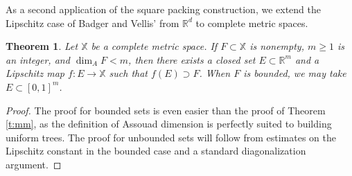 \documentclass[12pt]{amsart}
\newtheorem{theorem}{Theorem}[section]
\theoremstyle{definition}
\theoremstyle{remark}
\newcommand{\RR}{\mathbb{R}}
\newcommand{\XX}{\mathbb{X}}
\numberwithin{figure}{section}
\numberwithin{equation}{section}
\begin{document}
As a second application of the square packing construction, we extend the Lipschitz case of Badger and Vellis' \cite[Theorem 3.2]{BV} from $\RR^d$ to complete metric spaces.

\begin{theorem}\label{t:null} Let $\XX$ be a complete metric space. If $F\subset\XX$ is nonempty, $m\geq 1$ is an integer, and $\dim_A F<m$, then there exists a closed set $E\subset\RR^m$ and a Lipschitz map $f:E\rightarrow\XX$ such that $f(E)\supset F$. When $F$ is bounded, we may take $E\subset[0,1]^m$.\end{theorem}

\begin{proof} The proof for bounded sets is even easier than the proof of Theorem \ref{t:mm}, as the definition of Assouad dimension is perfectly suited to building uniform trees. The proof for unbounded sets will follow from estimates on the Lipschitz constant in the bounded case and a standard diagonalization argument.


\end{proof}
\end{document}
